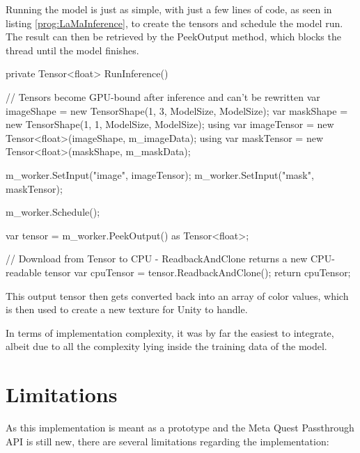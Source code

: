 Running the model is just as simple, with just a few lines of code, as seen in listing \ref{prog:LaMaInference}, to create the tensors and schedule the model run. The result can then be retrieved by the PeekOutput method, which blocks the thread until the model finishes.

\begin{listing}[h!]
\caption{LaMa Model Inference}
\label{prog:LaMaInference}
\begin{CsCodeCust}
private Tensor<float> RunInference() {
    // Tensors become GPU-bound after inference and can't be rewritten
    var imageShape = new TensorShape(1, 3, ModelSize, ModelSize);
    var maskShape = new TensorShape(1, 1, ModelSize, ModelSize);
    using var imageTensor = new Tensor<float>(imageShape, m_imageData);
    using var maskTensor = new Tensor<float>(maskShape, m_maskData);

    m_worker.SetInput("image", imageTensor);
    m_worker.SetInput("mask", maskTensor);

    m_worker.Schedule();

    var tensor = m_worker.PeekOutput() as Tensor<float>;

    // Download from Tensor to CPU - ReadbackAndClone returns a new CPU-readable tensor
    var cpuTensor = tensor.ReadbackAndClone();
    return cpuTensor;
}
\end{CsCodeCust}
\end{listing}

This output tensor then gets converted back into an array of color values, which is then used to create a new texture for Unity to handle.

In terms of implementation complexity, it was by far the easiest to integrate, albeit due to all the complexity lying inside the training data of the model.

\section{Limitations}
\label{cha:limitations}

As this implementation is meant as a prototype and the Meta Quest Passthrough API is still new, there are several limitations regarding the implementation:


